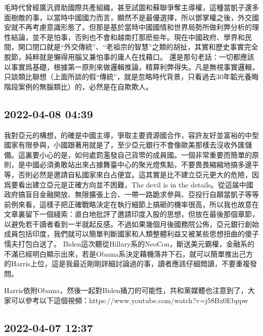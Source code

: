 \documentclass[twocolumn]{ctexart}
\begin{document}
毛時代曾經廣汎資助國際共產組織，甚至試圖和蘇聯爭奪主導權，這種當凱子還多面樹敵的事，以當時中國國力而言，顯然不是最優選擇，所以鄧掌權之後，外交國安就不再考慮意識形態了。但那是基於當時中國國情和世界局勢所做利弊分析的理性結論，並不是怕事，否則也不會和越南打那麽些年。現在中國政府、學界和民間，開口閉口就是“外交傳統”、“老祖宗的智慧”之類的胡扯，其實和歷史事實完全脫節，純粹就是懶得用腦又兼怕事的庸人在找藉口。
還是那句老話：一切都應該以事實爲基礎，根據第一原則來做邏輯推論，精算利弊得失。凡是無視事實邏輯，只談類比聯想（上面所談的假“傳統”，就是忽略時代背景，只看過去30年韜光養晦階段案例的無腦類比）的，必然是在自欺欺人。
\subsection*{2022-04-08 04:39}

我對亞元的構想，的確是中國主導，爭取主要資源國合作，容許友好並富裕的中型國家有限參與，小國跟著用就是了，至少亞元銀行不會像歐美那樣去沒收外匯儲備。這裏要小心的是，如何處罰濫發自己貨幣的成員國。一個非常重要而簡單的原則，是中國必須勇敢站出來占據舞臺中心的聚光燈焦點，不要畏畏縮縮地搞多邊平等，否則必然是邀請自私國家來白占便宜。這其實是比不建立亞元更大的危險，因爲要看出建立亞元是正確方向並不困難，The devil is in the details。從這届中國政府搞盲目金融開放、無限擴張上合、一帶一路跪求參與、亞投行自願當凱子等等前例來看，這樣子把正確戰略決定在執行細節上搞砸的機率很高，所以我也故意在文章裏留下一個綫索：直白地批評了邀請印度入股的思想，但放在最後那個章節，以避免若干讀者看到一半就起反感。不過如果幾個月後國務院公佈，亞元銀行創始成員包括印度，我們就可以簡單判斷國家和人類整體利益又被某些思想扭曲的傻子懦夫打包白送了。
Biden這次聽從Hillary系的NeoCon，斷送美元霸權，金融系的不滿已經明白顯示出來，若是Obama系決定藉機落井下石，就可以簡單推出己方的Harris上位，這是我最近剛剛詳細討論過的事，讀者應該仔細閲讀，不要重複發問。

Harris依附Obama，然後一起對Biden捅刀的可能性，共和黨媒體也注意到了，大家可以參考以下這個視頻：https://www.youtube.com/watch?v=j58Bx0Ebppw
\subsection*{2022-04-07 12:37}
\end{document}
